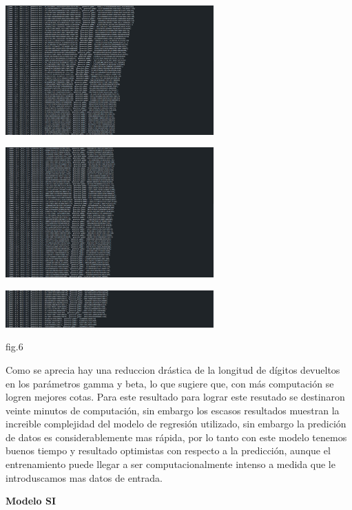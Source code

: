     \begin{center}
        
        \includegraphics[width=0.6\textwidth]{images/1.png}

        \includegraphics[width=0.6\textwidth]{images/2.png}
        
        \includegraphics[width=0.6\textwidth]{images/3.png}
        \begin{center}
            fig.6
        \end{center} 

\end{center}

Como se aprecia hay una reduccion drástica de la longitud de dígitos devueltos en los parámetros gamma y beta, lo que sugiere que, con más computación se logren 
mejores cotas. Para este resultado para lograr este resutado se destinaron veinte minutos de computación, sin embargo los escasos resultados muestran la increible 
complejidad del modelo de regresión utilizado, sin embargo la predición de datos es considerablemente mas rápida, por lo tanto con este modelo tenemos buenos tiempo 
y resultado optimistas con respecto a la predicción, aunque el entrenamiento puede llegar a ser computacionalmente intenso a medida que le introduscamos mas datos de entrada.

\textbf{Modelo SI} \\

